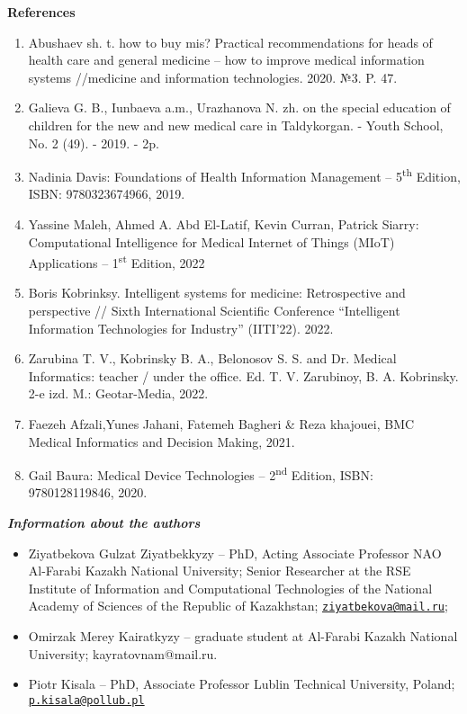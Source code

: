 \begin{center}
{\bfseries References}
\end{center}

\begin{enumerate}
\def\labelenumi{\arabic{enumi}.}
\item
  Abushaev sh. t. how to buy mis? Practical recommendations for heads of
  health care and general medicine -- how to improve medical information
  systems //medicine and information technologies. 2020. №3. P. 47.
\item
  Galieva G. B., Iunbaeva a.m., Urazhanova N. zh. on the special
  education of children for the new and new medical care in Taldykorgan.
  - Youth School, No. 2 (49). - 2019. - 2p.
\item
  Nadinia Davis: Foundations of Health Information Management --
  5\textsuperscript{th} Edition, ISBN: 9780323674966, 2019.
\item
  Yassine Maleh, Ahmed A. Abd El-Latif, Kevin Curran, Patrick Siarry:
  Computational Intelligence for Medical Internet of Things (MIoT)
  Applications -- 1\textsuperscript{st} Edition, 2022
\item
  Boris Kobrinksy. Intelligent systems for medicine: Retrospective and
  perspective // Sixth International Scientific Conference ``Intelligent
  Information Technologies for Industry'' (IITI'22). 2022.
\item
  Zarubina T. V., Kobrinsky B. A., Belonosov S. S. and Dr. Medical
  Informatics: teacher / under the office. Ed. T. V. Zarubinoy, B. A.
  Kobrinsky. 2-e izd. M.: Geotar-Media, 2022.
\item
  Faezeh Afzali,Yunes Jahani, Fatemeh Bagheri \& Reza khajouei, BMC
  Medical Informatics and Decision Making, 2021.
\item
  Gail Baura: Medical Device Technologies -- 2\textsuperscript{nd}
  Edition, ISBN: 9780128119846, 2020.
\end{enumerate}

\begin{center}
\emph{{\bfseries Information about the authors}}
\end{center}

\begin{itemize}
\item
Ziyatbekova Gulzat Ziyatbekkyzy -- PhD, Acting Associate Professor NAO
Al-Farabi Kazakh National University; Senior Researcher at the RSE
Institute of Information and Computational Technologies of the National
Academy of Sciences of the Republic of Kazakhstan;
\href{mailto:ziyatbekova@mail.ru}{\nolinkurl{ziyatbekova@mail.ru}};

\item
Omirzak Merey Kairatkyzy -- graduate student at Al-Farabi Kazakh
National University; kayratovnam@mail.ru.

\item
Piotr Kisala -- PhD, Associate Professor Lublin Technical University,
Poland; \href{mailto:p.kisala@pollub.pl}{\nolinkurl{p.kisala@pollub.pl}}
\end{itemize}

